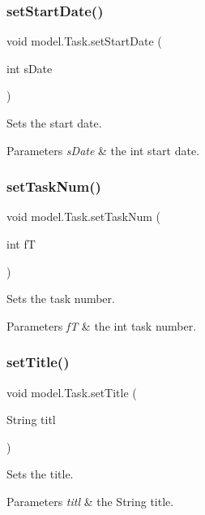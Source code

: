 \subsubsection{set\+Start\+Date()}
{\footnotesize\ttfamily void model.\+Task.\+set\+Start\+Date (\begin{DoxyParamCaption}\item[{int}]{s\+Date }\end{DoxyParamCaption})\hspace{0.3cm}{\ttfamily [private]}}

Sets the start date. 
\begin{DoxyParams}{Parameters}
{\em s\+Date} & the int start date. \\
\hline
\end{DoxyParams}
\mbox{\label{classmodel_1_1_task_ac3dcd70f96b081a4595ae6b3c2a3a398}} 
\subsubsection{set\+Task\+Num()}
{\footnotesize\ttfamily void model.\+Task.\+set\+Task\+Num (\begin{DoxyParamCaption}\item[{int}]{fT }\end{DoxyParamCaption})\hspace{0.3cm}{\ttfamily [private]}}

Sets the task number. 
\begin{DoxyParams}{Parameters}
{\em fT} & the int task number. \\
\hline
\end{DoxyParams}
\mbox{\label{classmodel_1_1_task_aed57fa2ec0d58e881aa96e8f9b907fb2}} 
\subsubsection{set\+Title()}
{\footnotesize\ttfamily void model.\+Task.\+set\+Title (\begin{DoxyParamCaption}\item[{String}]{titl }\end{DoxyParamCaption})\hspace{0.3cm}{\ttfamily [private]}}

Sets the title. 
\begin{DoxyParams}{Parameters}
{\em titl} & the String title. \\
\hline
\end{DoxyParams}
\mbox{\label{classmodel_1_1_task_a52778f33f6c70a71a4e15e6486952f08}} 
